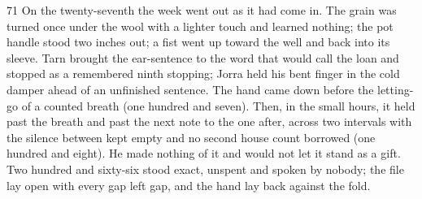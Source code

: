 \begin{CRchronicle}{71}
On the twenty-seventh the week went out as it had come in. The grain was turned once under the wool with a lighter touch and learned nothing; the pot handle stood two inches out; a fist went up toward the well and back into its sleeve. Tarn brought the ear-sentence to the word that would call the loan and stopped as a remembered ninth stopping; Jorra held his bent finger in the cold damper ahead of an unfinished sentence. The hand came down before the letting-go of a counted breath (one hundred and seven). Then, in the small hours, it held past the breath and past the next note to the one after, across two intervals with the silence between kept empty and no second house count borrowed (one hundred and eight). He made nothing of it and would not let it stand as a gift. Two hundred and sixty-six stood exact, unspent and spoken by nobody; the file lay open with every gap left gap, and the hand lay back against the fold.
\end{CRchronicle}
